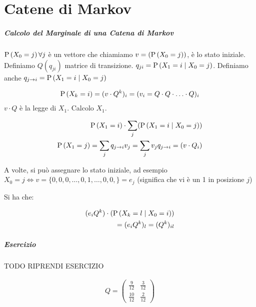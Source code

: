 \chapter{Catene di Markov}


\paragraph{Calcolo del Marginale di una Catena di Markov}
$ \text{P}\left(X_0 = j\right) \forall j $ è un vettore che chiamiamo $ v = (\text{P}\left(X_0 = j\right)) $, è lo stato iniziale. Definiamo $ Q(q_{ji}) $ matrice di transizione. $ q_{ji} = \text{P}\left(X_1 = i \mid X_0 = j\right) $. Definiamo anche $ q_{j \to i} = \text{P}\left(X_1 = i \mid X_0 = j\right) $

\[ 
\begin{aligned}
	\text{P}\left(X_k = i\right) = (v \cdot Q^k)_i = (v_i = Q \cdot Q \cdot \hdots \cdot Q)_i
\end{aligned}
 \]
$ v \cdot Q $ è la legge di $ X_1 $. Calcolo $ X_1 $.

\[ \begin{aligned}
\text{P}\left(X_1 = i\right) \cdot \sum_j (\text{P}\left(X_1 = i \mid X_0 = j\right)) \\
\text{P}\left(X_1 = j\right) = \sum_j q_{j \to i} v_j = \sum_j v_j q_{j \to i} = (v \cdot Q_i)
\end{aligned} \]


A volte, si può assegnare lo stato iniziale, ad esempio $ X_0 = j \iff v = \{0, 0, 0, \hdots, 0, 1, \hdots, 0, 0,\} = e_j $ (significa che vi è un 1 in posizione $ j $) 

Si ha che:

\[ \begin{aligned}
(e_i Q^k) \cdot (\text{P}\left(X_k = l \mid X_0 = i\right) ) \\ 
= (e_i Q^k)_l = (Q^k)_{il}
\end{aligned} \]

\paragraph{Esercizio}

TODO RIPRENDI ESERCIZIO 

\[ \begin{aligned}
Q=\begin{pmatrix}
\frac{9}{12} & \frac{3}{12} \\
\frac{10}{12} & \frac{2}{12}
\end{pmatrix}
\end{aligned} \]

